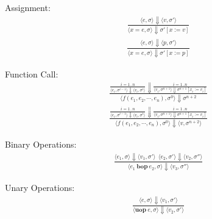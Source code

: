 \documentclass[12pt]{article}
\begin{document}
	Assignment:
	\begin{align*}
		\frac{\langle e, \sigma \rangle\Downarrow \langle v, \sigma' \rangle}
		{\langle x = e, \sigma \rangle\Downarrow \sigma' [x := v]}
	\end{align*}
	\begin{align*}
		\frac{\langle e, \sigma \rangle\Downarrow \langle p, \sigma' \rangle}
		{\langle x = e, \sigma \rangle\Downarrow \sigma' [x := p]}
	\end{align*}

	Function Call:
	\begin{align*}
		\frac{
			\frac{i = 1..n}
			{
				\langle e_i, \sigma^{i - 1} \rangle\Downarrow
				\langle v_i, \sigma^i \rangle
			}
			\Downarrow
			\frac{i = 1..n}
			{
				\langle v_i, \sigma^{n + 1} \rangle\Downarrow
				\sigma^{n + 1}[x_i := v_i]
			}
		}
		{\langle f(e_1, e_2, \cdots, e_n), \sigma^0 \rangle\Downarrow \sigma^{n + 2}}
	\end{align*}
	\begin{align*}
		\frac{
			\frac{i = 1..n}
			{
				\langle e_i, \sigma^{i - 1} \rangle\Downarrow
				\langle v_i, \sigma^i \rangle
			}
			\Downarrow
			\frac{i = 1..n}
			{
				\langle v_i, \sigma^{n + 1} \rangle\Downarrow
				\sigma^{n + 1}[x_i := v_i]
			}
		}
		{\langle f(e_1, e_2, \cdots, e_n), \sigma^0 \rangle\Downarrow \langle v, \sigma^{n + 2} \rangle}
	\end{align*}


	Binary Operations:
	\begin{align*}
		\frac{\langle e_1, \sigma \rangle\Downarrow \langle v_1, \sigma' \rangle \ \
		\langle e_2, \sigma' \rangle\Downarrow \langle v_2, \sigma'' \rangle}
		{\langle e_1\ \textbf{bop}\ e_2, \sigma \rangle\Downarrow \langle v_3, \sigma'' \rangle}
	\end{align*}
	
	Unary Operations:
	\begin{align*}
		\frac{\langle e, \sigma \rangle\Downarrow \langle v_1, \sigma' \rangle}
		{\langle \textbf{uop}\ e, \sigma \rangle\Downarrow \langle v_2, \sigma' \rangle}
	\end{align*}
\end{document}
